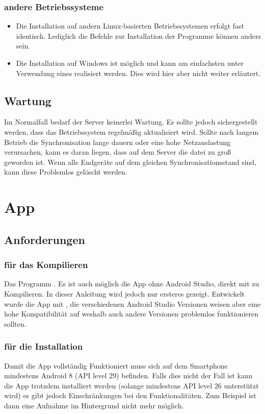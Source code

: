 \documentclass{article}
\begin{document}
\subsubsection{andere Betriebssysteme}
\begin{itemize}
    \item Die Installation auf andern Linux-basierten Betriebssystemen erfolgt
        fast identisch. Lediglich die Befehle zur Installation
        der Programme können anders sein.
    \item Die Installation auf Windows ist möglich und kann am einfachsten 
        unter Verwendung eines  realisiert werden. Dies 
        wird hier aber nicht weiter erläutert.
\end{itemize}
\subsection{Wartung}
Im Normalfall bedarf der Server keinerlei Wartung. 
Es sollte jedoch sichergestellt werden, dass das Betriebssystem regelmäßig aktualisiert
wird. Sollte nach langem Betrieb die Synchronisation lange dauern oder eine 
hohe Netzauslastung verursachen, kann es daran liegen, dass auf dem Server
die datei  zu groß geworden ist. Wenn alle Endgeräte auf dem 
gleichen Synchronisationsstand sind, kann diese Problemlos gelöscht werden.
\section{App}
\subsection{Anforderungen}
\subsubsection{für das Kompilieren}
Das Programm . Es ist auch möglich die App ohne Android Studio, direkt mit  zu Kompilieren.
In dieser Anleitung wird jedoch nur ersteres gezeigt. Entwickelt wurde die App mit , die
verschiedenen Android Studio Versionen weisen aber eine hohe Kompatibilität auf weshalb auch andere Versionen
problemlos funktionieren sollten.
\subsubsection{für die Installation}
Damit die App vollständig Funktioniert muss sich auf dem Smartphone mindestens Android 8 (API level 29) befinden.
Falls dies nicht der Fall ist kann die App trotzdem installiert werden (solange mindestens API level 26 unterstützt wird)
es gibt jedoch Einschränkungen bei den Funktionalitäten. Zum Beispiel ist dann eine Aufnahme im Hintergrund nicht mehr
möglich.
\end{document}
